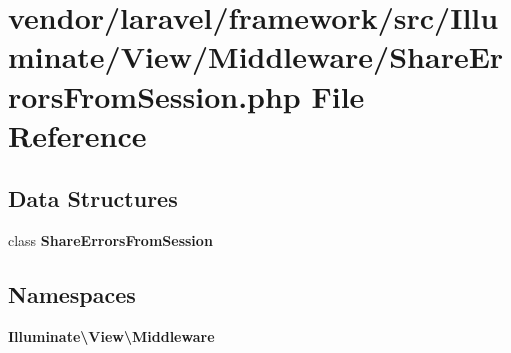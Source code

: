 \section{vendor/laravel/framework/src/\+Illuminate/\+View/\+Middleware/\+Share\+Errors\+From\+Session.php File Reference}
\label{_share_errors_from_session_8php}
\subsection*{Data Structures}
\begin{DoxyCompactItemize}
\item 
class {\bf Share\+Errors\+From\+Session}
\end{DoxyCompactItemize}
\subsection*{Namespaces}
\begin{DoxyCompactItemize}
\item 
 {\bf Illuminate\textbackslash{}\+View\textbackslash{}\+Middleware}
\end{DoxyCompactItemize}
